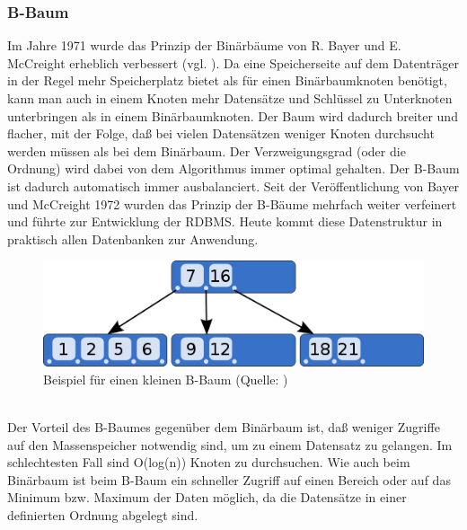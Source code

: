 \subsubsection{B-Baum}
Im Jahre 1971 wurde das Prinzip der Binärbäume von R. Bayer und E. McCreight erheblich verbessert (vgl. \cite{Bayer1972}).
Da eine Speicherseite auf dem Datenträger in der Regel mehr Speicherplatz bietet als für einen Binärbaumknoten benötigt, kann man auch in einem Knoten mehr Datensätze und Schlüssel zu Unterknoten unterbringen als in einem Binärbaumknoten. Der Baum wird dadurch breiter und flacher, mit der Folge, daß bei vielen Datensätzen weniger Knoten durchsucht werden müssen als bei dem Binärbaum. Der Verzweigungsgrad (oder die Ordnung) wird dabei von dem Algorithmus immer optimal gehalten. Der B-Baum ist dadurch automatisch immer ausbalanciert. Seit der Veröffentlichung von Bayer und McCreight 1972 wurden das Prinzip der B-Bäume mehrfach weiter verfeinert und führte zur Entwicklung der RDBMS. Heute kommt diese Datenstruktur in praktisch allen Datenbanken zur Anwendung.\\
\begin{figure}[h]
\includegraphics[width=.85\textwidth]{img/B-tree.png}
\caption[Beispiel für einen kleinen B-Baum]{Beispiel für einen kleinen B-Baum (Quelle: \cite{wmc})}
\label{bbaum}
\end{figure}
\\Der Vorteil des B-Baumes gegenüber dem Binärbaum ist, daß weniger Zugriffe auf den Massenspeicher notwendig sind, um zu einem Datensatz zu gelangen. Im schlechtesten Fall sind O(log(n)) Knoten zu durchsuchen. Wie auch beim Binärbaum ist beim B-Baum ein schneller Zugriff auf einen Bereich oder auf das Minimum bzw. Maximum der Daten möglich, da die Datensätze in einer definierten Ordnung abgelegt sind.

